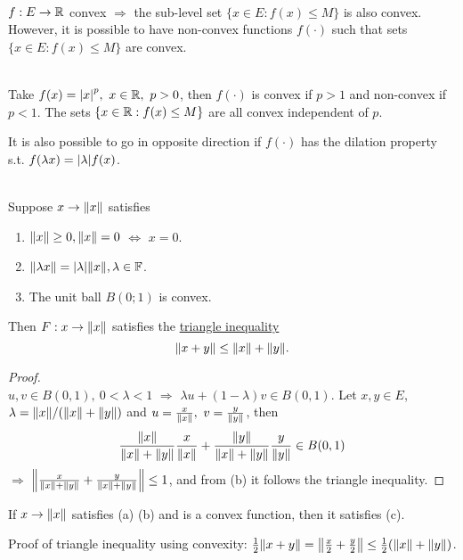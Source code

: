 \begin{remark}\ \\
$f: E \to \mathbb{R}$ convex $\Rightarrow$ the sub-level set $\{x \in E: f(x) \leq M\}$ is also convex. However, it is possible to have non-convex functions $f(\cdot)$ such that sets $\{x \in E: f(x) \leq M\}$ are convex.
\begin{example}\ \\
Take $f(x) = \abs{x}^p,\ x \in \mathbb{R},\ p > 0$, then $f(\cdot)$ is convex if $p > 1$ and non-convex if $p < 1$. The sets $\{x \in \mathbb{R}: f(x) \leq M\}$ are all convex independent of $p$.
\end{example}
It is also possible to go in opposite direction if $f(\cdot)$ has the dilation property s.t. $f(\lambda x ) = \abs{\lambda} f(x)$.
\begin{corollary}\label{1.10}\ \\
Suppose $x \to \norm{x}$ satisfies
\begin{enumerate}[label = (\alph*)]
    \item $\norm{x} \geq 0, \norm{x} = 0$ $\Leftrightarrow$ $x = 0$.
    \item $\norm{\lambda x} = \abs{\lambda} \norm{x}, \lambda \in \mathbb{F}$.
    \item The unit ball $B(0;1)$ is convex.
\end{enumerate}
Then $F: x \to \norm{x}$ satisfies the \underline{triangle inequality}
$$\norm{x + y} \leq \norm{x} + \norm{y}.$$
\end{corollary}
\begin{proof}\ \\
    $u,v \in B(0,1),\ 0 < \lambda < 1$ $\Rightarrow$ $\lambda u + (1 - \lambda) v \in B(0,1)$. Let $x,y \in E$, $\lambda = \norm{x} / (\norm{x} + \norm{y})$ and $u = \frac{x}{\norm{x}},\ v = \frac{y}{\norm{y}}$, then
    $$\frac{\norm{x}}{\norm{x} + \norm{y}} \frac{x}{\norm{x}} + \frac{\norm{y}}{\norm{x} + \norm{y}} \frac{y}{\norm{y}} \in B(0,1)$$
$\Rightarrow$ $\norm{\frac{x}{\norm{x} + \norm{y}} + \frac{y}{\norm{x} + \norm{y}}} \leq 1$, and from (b) it follows the triangle inequality.
\end{proof}
\begin{remark}
If $x \to \norm{x}$ satisfies (a) (b) and is a convex function, then it satisfies (c).
\end{remark}
Proof of triangle inequality using convexity: $\frac{1}{2} \norm{x + y} = \norm{\frac{x}{2} + \frac{y}{2}} \leq \frac{1}{2} (\norm{x} + \norm{y})$.
\end{remark}




